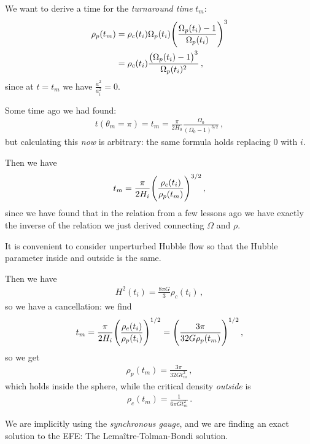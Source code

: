 \documentclass[main.tex]{subfiles}
\begin{document}
We want to derive a time for the \emph{turnaround time} \(t_m\): 
%
\begin{subequations}
\begin{align}
\rho_{p} (t_m) &= \rho_{c} (t_i) \Omega_{p}(t_i) \qty(\frac{\Omega_{p}(t_i) - 1}{\Omega_{p} (t_i)})^3  \\
&= \rho_{c}(t_i) \frac{\qty(\Omega_{p}(t_i) - 1)^3}{\Omega_{p}(t_i)^2}
\,,
\end{align}
\end{subequations}
%
since at \(t = t_m\) we have \(\frac{\dot{a}^2}{a_{i}^2} = 0\). 

Some time ago we had found: 
%
\begin{align}
t (\theta_{m} = \pi ) = t_m = \frac{\pi }{2 H_0 } \frac{\Omega_0 }{(\Omega_0 - 1)^{3/2}}
\,,
\end{align}
%
but calculating this \emph{now} is arbitrary: the same formula holds replacing \(0\) with \(i\). 

Then we have 
%
\begin{align}
t_m = \frac{\pi }{2 H_i} \qty(\frac{\rho_{c}(t_i)}{\rho_{p}(t_m)})^{3/2}
\,,
\end{align}
%
since we have found that in the relation from a few lessons ago we have exactly the inverse of the relation we just derived connecting \(\Omega \) and \(\rho \). 

It is convenient to consider unperturbed Hubble flow so that the Hubble parameter inside and outside is the same. 

Then we have 
%
\begin{align}
H^2(t_i) = \frac{8 \pi G}{3} \rho_{c}(t_i)
\,,
\end{align}
%
so we have a cancellation: we find 
%
\begin{align}
t_m = \frac{\pi }{2 H_i} \qty(\frac{\rho_{c}(t_i)}{\rho_{p}(t_i)})^{1/2} = \qty(\frac{3 \pi }{32 G \rho_{p}(t_m)})^{1/2}
\,,
\end{align}
%
so we get 
%
\begin{align}
\rho_{p} (t_m) = \frac{3 \pi }{32 G t_m^2}
\,,
\end{align}
%
which holds inside the sphere, while the critical density \emph{outside} is 
%
\begin{align}
\rho_{c}(t_m) = \frac{1}{6 \pi G t_m^2}
\,.
\end{align}

We are implicitly using the \emph{synchronous gauge}, and we are finding an exact solution to the EFE: The Lemaître-Tolman-Bondi solution. 
\end{document}
